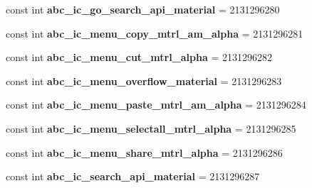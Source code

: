 \begin{DoxyCompactItemize}
\item 
\mbox{\label{classst_delivery_1_1_resource_1_1_drawable_acdf5a9d6802c4a236b339c5e00cfbf2b}} 
const int {\bfseries abc\+\_\+ic\+\_\+go\+\_\+search\+\_\+api\+\_\+material} = 2131296280
\item 
\mbox{\label{classst_delivery_1_1_resource_1_1_drawable_a21266173742468e618efeea6bacaaa42}} 
const int {\bfseries abc\+\_\+ic\+\_\+menu\+\_\+copy\+\_\+mtrl\+\_\+am\+\_\+alpha} = 2131296281
\item 
\mbox{\label{classst_delivery_1_1_resource_1_1_drawable_a68a142850b40a43ff93cd7f064325126}} 
const int {\bfseries abc\+\_\+ic\+\_\+menu\+\_\+cut\+\_\+mtrl\+\_\+alpha} = 2131296282
\item 
\mbox{\label{classst_delivery_1_1_resource_1_1_drawable_a7547c00a84c7334cee96c9e74afc6a61}} 
const int {\bfseries abc\+\_\+ic\+\_\+menu\+\_\+overflow\+\_\+material} = 2131296283
\item 
\mbox{\label{classst_delivery_1_1_resource_1_1_drawable_a8d0d43d94f90c34fed88f4ac64fc3df5}} 
const int {\bfseries abc\+\_\+ic\+\_\+menu\+\_\+paste\+\_\+mtrl\+\_\+am\+\_\+alpha} = 2131296284
\item 
\mbox{\label{classst_delivery_1_1_resource_1_1_drawable_a187f2aa04588a83311379314a404a81a}} 
const int {\bfseries abc\+\_\+ic\+\_\+menu\+\_\+selectall\+\_\+mtrl\+\_\+alpha} = 2131296285
\item 
\mbox{\label{classst_delivery_1_1_resource_1_1_drawable_aed57e7f6155cc39aa06fb5711e9ed936}} 
const int {\bfseries abc\+\_\+ic\+\_\+menu\+\_\+share\+\_\+mtrl\+\_\+alpha} = 2131296286
\item 
\mbox{\label{classst_delivery_1_1_resource_1_1_drawable_a20788abbe7efa8263a6779c259f9f78b}} 
const int {\bfseries abc\+\_\+ic\+\_\+search\+\_\+api\+\_\+material} = 2131296287
\item 

\end{DoxyCompactItemize}
